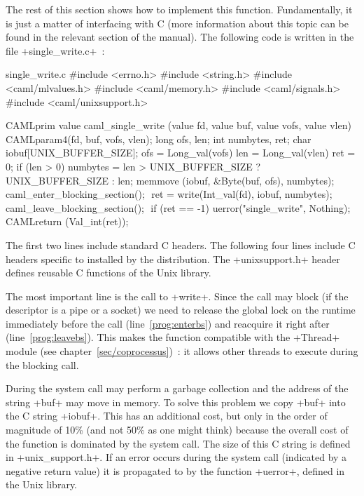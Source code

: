 The rest of this section shows how to implement this
function. Fundamentally, it is just a matter of interfacing {\ocaml} with
C (more information about this topic can be found in the relevant
section of the {\ocaml} manual). The following code is written in the file
\ml+single_write.c+~:
%
\begin{listingcodefile}[style=numbers]{single_write.c}
#include <errno.h>
#include <string.h>
#include <caml/mlvalues.h>
#include <caml/memory.h>
#include <caml/signals.h>
#include <caml/unixsupport.h>

CAMLprim value caml_single_write
        (value fd, value buf, value vofs, value vlen) {
  CAMLparam4(fd, buf, vofs, vlen);
  long ofs, len;
  int numbytes, ret;
  char iobuf[UNIX_BUFFER_SIZE];
  ofs = Long_val(vofs)
  len = Long_val(vlen)
  ret = 0;
  if (len > 0) {
    numbytes = len > UNIX_BUFFER_SIZE ? UNIX_BUFFER_SIZE : len;
    memmove (iobuf, &Byte(buf, ofs), numbytes);
    caml_enter_blocking_section(); $\label{prog:enterbs}$
    ret = write(Int_val(fd), iobuf, numbytes);
    caml_leave_blocking_section(); $\label{prog:leavebs}$
    if (ret == -1) uerror("single_write", Nothing);
  }
  CAMLreturn (Val_int(ret));
}
\end{listingcodefile}
% 
The first two lines include standard C headers. The following four
lines include C headers specific to {\ocaml} installed by the
distribution. The \ml+unixsupport.h+ header defines reusable C
functions of the {\ocaml} Unix library.

The most important line is the call to \ml+write+. Since the call may
block (if the descriptor is a pipe or a socket) we need to release the
global lock on the {\ocaml} runtime immediately before the call
(line~\ref{prog:enterbs}) and reacquire it right after
(line~\ref{prog:leavebs}). This makes the function compatible with the
\ml+Thread+ module (see chapter~\ref{sec/coprocessus})~: it allows
other threads to execute during the blocking call. 

During the system call {\ocaml} may perform a garbage collection and
the address of the {\ocaml} string \ml+buf+ may move in memory. To
solve this problem we copy \ml+buf+ into the C string \ml+iobuf+.
This has an additional cost, but only in the order of magnitude of
10\% (and not 50\% as one might think) because the overall cost of the
function is dominated by the system call. The size of this C string is
defined in \ml+unix_support.h+. If an error occurs during the system
call (indicated by a negative return value) it is propagated to
{\ocaml} by the function \ml+uerror+, defined in the {\ocaml} Unix library.


